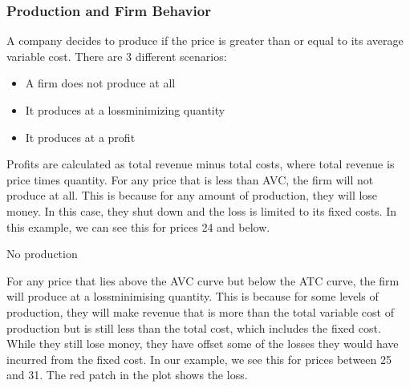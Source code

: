 \documentclass[letterpaper,10pt,english]{jupyterBook}
\begin{document}
\subsubsection{Production and Firm Behavior}
\label{\detokenize{content/02-supply/01-supply:production-and-firm-behavior}}
\sphinxAtStartPar
A company decides to produce if the price is greater than or equal to its average variable cost. There are 3 different scenarios:
\begin{itemize}
\item {} 
\sphinxAtStartPar
A firm does not produce at all

\item {} 
\sphinxAtStartPar
It produces at a loss\sphinxhyphen{}minimizing quantity

\item {} 
\sphinxAtStartPar
It produces at a profit

\end{itemize}

\sphinxAtStartPar
Profits are calculated as total revenue minus total costs, where total revenue is price times quantity. For any price that is less than AVC, the firm will not produce at all. This is because for any amount of production, they will lose money. In this case, they shut down and the loss is limited to its fixed costs. In this example, we can see this for prices 24 and below.

\begin{sphinxVerbatim}[commandchars=\\\{\}]
 
\end{sphinxVerbatim}

\begin{sphinxVerbatim}[commandchars=\\\{\}]
No production
\end{sphinxVerbatim}

\noindent{}

\sphinxAtStartPar
For any price that lies above the AVC curve but below the ATC curve, the firm will produce at a loss\sphinxhyphen{}minimising quantity. This is because for some levels of production, they will make revenue that is more than the total variable cost of production but is still less than the total cost, which includes the fixed cost. While they still lose money, they have offset some of the losses they would have incurred from the fixed cost. In our example, we see this for prices between 25 and 31. The red patch in the plot shows the loss.
\end{document}
